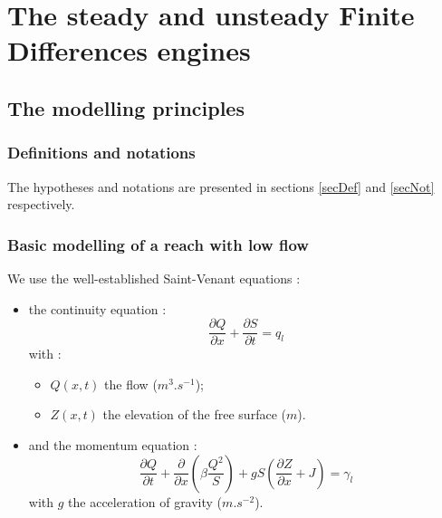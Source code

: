 \chapter{The steady \SARAP{} and unsteady \REZO{} Finite Differences engines}
\label{Chapter2}

\section{The modelling principles}

\subsection{Definitions and notations}

The hypotheses and notations are presented in sections \ref{secDef} and \ref{secNot} respectively.

\subsection{Basic modelling of a reach with low flow}

We use the well-established Saint-Venant equations :

\begin{itemize}
 \item the continuity equation :
   \begin{equation}
     \label{masse}
     \frac{\partial Q}{\partial x} + \frac{\partial S}{\partial t}= q_l
   \end{equation}
   with :
   \begin{itemize}
     \item $Q(x,t)$ the flow ($m^3.s^{-1}$);
     \item $Z(x,t)$ the elevation of the free surface ($m$).
   \end{itemize}
 \item and the momentum equation :
   \begin{equation}
     \label{qmv}
     \frac{\partial Q}{\partial t} + \frac{\partial}{\partial x}\left( {\beta \frac{Q^2}{S}} \right) + g S \left( \frac{\partial Z}{\partial x} + J \right) = \gamma_l
   \end{equation}
   with $g$ the acceleration of gravity ($m.s^{-2}$).

\end{itemize}

